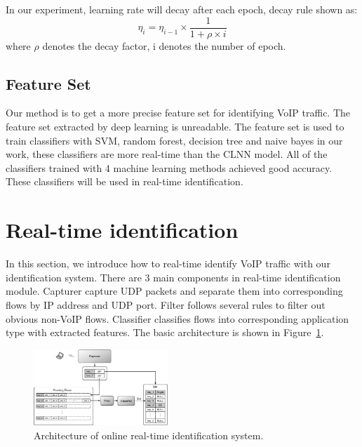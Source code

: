 \documentclass[conference]{IEEEtran}
\begin{document}
In our experiment, learning rate will decay after each epoch, decay rule shown as:
\begin{equation}
{\eta _i} = {\eta _{i - 1}} \times \frac{1}{{1 + \rho  \times i}}
\end{equation}
where ${\rho }$ denotes the decay factor, i denotes the number of epoch.

\subsection{Feature Set}
Our method is to get a more precise feature set for identifying VoIP traffic. The feature set extracted by deep learning is unreadable. The feature set is used to train classifiers with SVM, random forest, decision tree and naive bayes in our work, these classifiers are more real-time than the CLNN model. All of the classifiers trained with 4 machine learning methods achieved good accuracy. These classifiers will be used in real-time identification.

\section{Real-time identification}
\label{sec:realtimeidentification}

In this section, we introduce how to real-time identify VoIP traffic with our identification system. There are 3 main components in real-time identification module. Capturer capture UDP packets and separate them into corresponding flows by IP address and UDP port. Filter follows several rules to filter out obvious non-VoIP flows. Classifier classifies flows into corresponding application type with extracted features. The basic architecture is shown in Figure~\ref{fig:online_architecture_new}.
\begin{figure}[htp]
\begin{center}
\includegraphics[width=0.45\textwidth]{online_architecture_new.eps}
\caption{Architecture of online real-time identification system.}\label{fig:online_architecture_new}
\end{center}
\end{figure}
\end{document}
